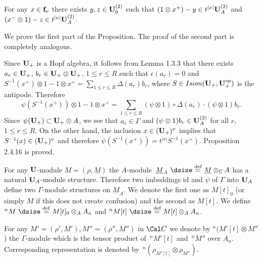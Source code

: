   For any  $x \in {\bold f}_\nu$  there exists
$y,z \in {\bold U}_0^{(2)}$  such that  $(1 \otimes x^+) - y \in t^{|\nu|}
{\bold U}_A^{(2)}$
and  $(x^- \otimes 1) - z \in t^{|\nu|} {\bold U}_A^{(2)}$.
\endproclaim

  We prove the first part of the Proposition.  The
proof of the second part is completely analogous.

Since  ${\bold U}_+$  is a Hopf algebra, it follows from Lemma 1.3.3 that
there exists $a_r \in {\bold U}_+$, $b_r \in {\bold U}_+ \otimes
{\bold U}_+$, $1 \le r \le R$  such that
$\epsilon(a_r) = 0$  and $S^{-1}(x^+) \otimes 1 - 1 \otimes x^+ =
\sum_{1\le r\le R} \Delta(a_r)b_r$, where $S \in Isom({\bold U}_+,
{\bold U}_+^{op})$  is the antipode.  Therefore
$$
\psi(S^{-1}(x^+)) \otimes 1 - 1 \otimes x^+ =  \sum_{1\le r\le R}
(\psi \otimes 1) \circ \Delta(a_r) \cdot (\psi \otimes 1) b_r.
$$
Since  $\psi({\bold U}_+) \subset {\bold U}_+ \otimes A$, we see that
$a_r \in \Gamma$ and  $(\psi \otimes 1)b_r \in {\bold U}_A^{(2)}$  for all
$r$,\ $1 \le r \le R$.  On the other hand, the inclusion  $x \in ({\bold
U}_+)^\nu$
implies that  $S^{-1}(x) \in ({\bold U}_+)^\nu$  and therefore
$\psi(S^{-1}(x^+)) = t^{|\nu|} S^{-1}(x^+)$.  Proposition 2.4.16 is proved.
\enddemo

  For any ${\bold U}$-module  $M = (\rho, \underline{M})$
the $A$-module\ $\underline{M}_A\ {\dsize\buildrel {\text{def}}\over =}\
\underline{M} \otimes_{\Bbb C} A$  has a natural  ${\bold U}_A$-module
structure.  Therefore two imbeddings id and $\psi$ of $\Gamma$ into
${\bold U}_A$  define two $\Gamma$-module structures on  $\underline{M}_A$.
We denote the first one as $M[t]_0$ (or simply $M$ if this does not create
confusion) and the second as $M[t]$.  We
define  ${}^nM\ {\dsize\buildrel{\text{def}}\over =}\ M[t]_0 \otimes_A A_n$
and  ${}^nM[t]\ {\dsize\buildrel{\text{def}}\over =}\ M[t] \otimes_A A_n$.

For any  $M' = (\rho',\underline{M}'), M'' = (\rho'', \underline{M}'')$  in
${\Cal C}$  we denote by ${}^n(M'[t] \otimes M''$) the $\Gamma$-module which
is the tensor product of\  ${}^nM'[t]$  and\ ${}^nM''$  over $A_n$.
Corresponding representation is denoted by\ ${}^n(\rho_{M'[t]} \otimes
\rho_{M''})$.

\medpagebreak

